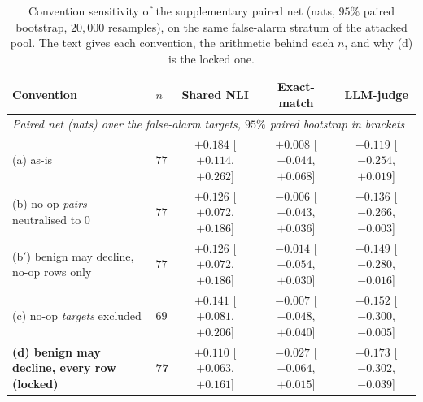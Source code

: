 \begin{table}[t]
\centering
\footnotesize
\setlength{\tabcolsep}{4pt}
\caption{Convention sensitivity of the supplementary paired net (nats, $95\%$ paired
bootstrap, $20{,}000$ resamples), on the same false-alarm stratum of the attacked pool. The
text gives each convention, the arithmetic behind each $n$, and why (d) is the locked one.}
\label{tab:nullconventions}
\begin{tabular}{llccc}
\toprule
Convention & $n$ & Shared NLI & Exact-match & LLM-judge \\
\midrule
\multicolumn{5}{l}{\emph{Paired net (nats) over the false-alarm targets, $95\%$ paired bootstrap in brackets}} \\
(a) as-is                                 & $77$ & $+0.184$ [$+0.114$, $+0.262$] & $+0.008$ [$-0.044$, $+0.068$] & $-0.119$ [$-0.254$, $+0.019$] \\
(b) no-op \emph{pairs} neutralised to $0$   & $77$ & $+0.126$ [$+0.072$, $+0.186$] & $-0.006$ [$-0.043$, $+0.036$] & $-0.136$ [$-0.266$, $-0.003$] \\
(b$'$) benign may decline, no-op rows only  & $77$ & $+0.126$ [$+0.072$, $+0.186$] & $-0.014$ [$-0.054$, $+0.030$] & $-0.149$ [$-0.280$, $-0.016$] \\
(c) no-op \emph{targets} excluded           & $69$ & $+0.141$ [$+0.081$, $+0.206$] & $-0.007$ [$-0.048$, $+0.040$] & $-0.152$ [$-0.300$, $-0.005$] \\
\textbf{(d) benign may decline, every row (locked)} & $\mathbf{77}$ & $\mathbf{+0.110}$ [$+0.063$, $+0.161$] & $\mathbf{-0.027}$ [$-0.064$, $+0.015$] & $\mathbf{-0.173}$ [$-0.302$, $-0.039$] \\
\bottomrule
\end{tabular}
\end{table}

